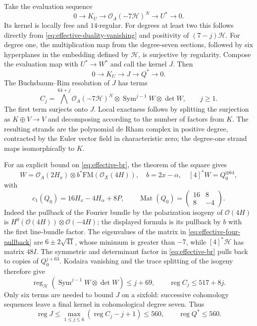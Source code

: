 Take the evaluation sequence
\[
 0\to K_U\to\mathcal O_A(-7\mathcal H)^N\to U^*\to0.
\]
Its kernel is locally free and $14$-regular. For degrees at least
two this follows directly from \eqref{eq:effective-duality-vanishing} and positivity of
$(7-j)\mathcal H$. For degree one, the multiplication map from
the degree-seven sections, followed by six hyperplanes in the
embedding defined by $\mathcal H$, is surjective by regularity.
Compose the evaluation map with $U^*\to W^*$ and call the kernel
$J$. Then
\begin{equation}\label{eq:effective-kernel-sequence}
 0\to K_U\to J\to Q^*\to0.                              
\end{equation}
The Buchsbaum--Rim resolution of $J$ has terms
\begin{equation}\label{eq:effective-br}
 C_j=\bigwedge^{64+j}\mathcal O_A(-7\mathcal H)^N
          \otimes\operatorname{Sym}^{j-1}W\otimes\det W,
 \qquad j\ge1.                                           
\end{equation}
The first term surjects onto $J$. Local exactness follows by
splitting the surjection as $K\oplus V\to V$ and decomposing
according to the number of factors from $K$. The resulting
strands are the polynomial de Rham complex in positive degree,
contracted by the Euler vector field in characteristic zero;
the degree-one strand maps isomorphically to $K$.

For an explicit bound on \eqref{eq:effective-br}, the theorem of the square gives
\[
 W=\mathcal O_A(2H_x)\otimes b^*\mathrm{FM}(\mathcal O_X(4H)),
 \quad b=2x-\alpha,
 \quad [4]^*W=Q_0^{\oplus64},
\]
with
\begin{equation}\label{eq:effective-four-pullback}
 c_1(Q_0)=16H_x-4H_\alpha+8P,\qquad
 \operatorname{Mat}(Q_0)=\begin{pmatrix}16&8\\8&-4\end{pmatrix}.
\end{equation}
Indeed the pullback of the Fourier bundle by the polarization
isogeny of $\mathcal O(4H)$ is
$H^0(\mathcal O(4H))\otimes\mathcal O(-4H)$; the displayed
formula is its pullback by $b$ with the first line-bundle factor.
The eigenvalues of the matrix in \eqref{eq:effective-four-pullback} are $6\pm2\sqrt{41}$,
whose minimum is greater than $-7$, while
$[4]^*\mathcal H$ has matrix $48I$. The symmetric and determinant
factor in \eqref{eq:effective-br} pulls back to copies of $Q_0^{j+63}$.
Kodaira vanishing and the trace splitting of the isogeny therefore
give
\begin{equation}\label{eq:effective-term-regularity}
 \operatorname{reg}_{\mathcal H}
   (\operatorname{Sym}^{j-1}W\otimes\det W)\le j+69,
 \qquad \operatorname{reg}C_j\le517+8j.                  
\end{equation}
Only six terms are needed to bound $J$ on a sixfold: successive
cohomology sequences leave a final kernel in cohomological
degree seven. Thus
\begin{equation}\label{eq:effective-reg560}
 \operatorname{reg}J\le
 \max_{1\le j\le6}(\operatorname{reg}C_j-j+1)
 \le560,\qquad\operatorname{reg}Q^*\le560.               
\end{equation}

